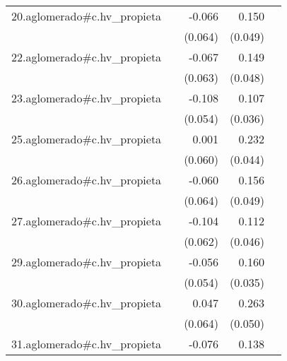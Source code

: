 {\begin{longtable}{l*{4}{D{.}{.}{-1}}}
\addlinespace
20.aglomerado#c.hv\_propieta&                     &      -0.066         &       0.150\sym{**} &                     \\
            &                     &     (0.064)         &     (0.049)         &                     \\
\addlinespace
22.aglomerado#c.hv\_propieta&                     &      -0.067         &       0.149\sym{**} &                     \\
            &                     &     (0.063)         &     (0.048)         &                     \\
\addlinespace
23.aglomerado#c.hv\_propieta&                     &      -0.108\sym{*}  &       0.107\sym{**} &                     \\
            &                     &     (0.054)         &     (0.036)         &                     \\
\addlinespace
25.aglomerado#c.hv\_propieta&                     &       0.001         &       0.232\sym{***}&                     \\
            &                     &     (0.060)         &     (0.044)         &                     \\
\addlinespace
26.aglomerado#c.hv\_propieta&                     &      -0.060         &       0.156\sym{**} &                     \\
            &                     &     (0.064)         &     (0.049)         &                     \\
\addlinespace
27.aglomerado#c.hv\_propieta&                     &      -0.104         &       0.112\sym{*}  &                     \\
            &                     &     (0.062)         &     (0.046)         &                     \\
\addlinespace
29.aglomerado#c.hv\_propieta&                     &      -0.056         &       0.160\sym{***}&                     \\
            &                     &     (0.054)         &     (0.035)         &                     \\
\addlinespace
30.aglomerado#c.hv\_propieta&                     &       0.047         &       0.263\sym{***}&                     \\
            &                     &     (0.064)         &     (0.050)         &                     \\
\addlinespace
31.aglomerado#c.hv\_propieta&                     &      -0.076         &       0.138\sym{**} &                     \\

\end{longtable}}
